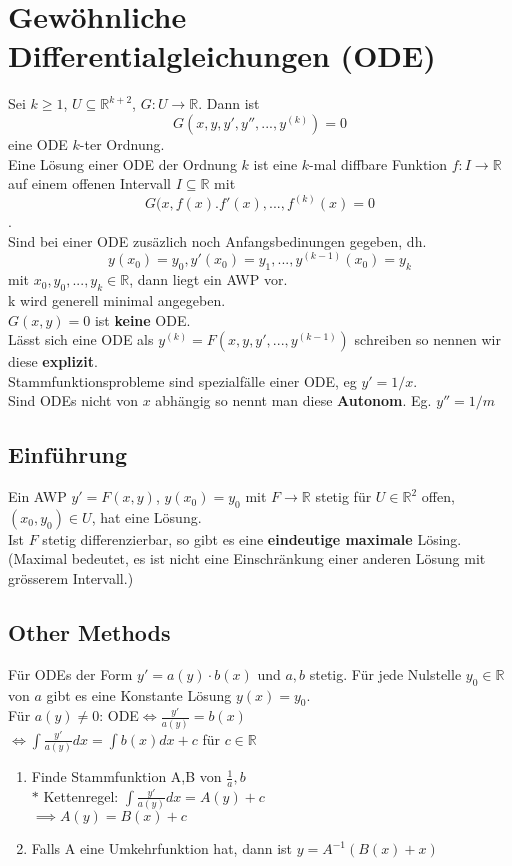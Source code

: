 \section{Gewöhnliche Differentialgleichungen (ODE)}
Sei $k\geq1$, $U\subseteq\mathbb R^{k+2}$, $G:U\rightarrow\mathbb R$. Dann ist 
$$G(x,y,y',y'',...,y^{(k)})=0$$ eine ODE $k$-ter Ordnung.\\
Eine Lösung einer ODE der Ordnung $k$ ist eine $k$-mal diffbare Funktion $f:I\rightarrow\mathbb R$
auf einem offenen Intervall $I\subseteq\mathbb R$ mit $$G(x, f(x). f'(x),...,
f^{(k)}(x)=0$$.\\
Sind bei einer ODE zusäzlich noch Anfangsbedinungen gegeben, dh.
$$y(x_0)=y_0,y'(x_0)=y_1,...,y^{(k-1)}(x_0)=y_k$$ mit $x_0,
y_0,...,y_k\in\mathbb R$, dann liegt ein AWP vor.\\
 k wird generell minimal angegeben. \\
$G(x, y)=0$ ist \textbf{keine} ODE.\\
Lässt sich eine ODE als $y^{(k)}=F(x,y,y',...,y^{(k-1)})$ schreiben so nennen
wir diese \textbf{explizit}.\\
Stammfunktionsprobleme sind spezialfälle einer ODE, eg $y'=1/x$.\\
Sind ODEs nicht von $x$ abhängig so nennt man diese \textbf{Autonom}. Eg.
$y''=1/m$\\
\subsection{Einführung}
Ein AWP $y'=F(x,y)$, $y(x_0)=y_0$ mit $F\rightarrow\mathbb R$ stetig für
$U\in\mathbb R^2$ offen, $(x_0,y_0)\in U$, hat eine Lösung.\\
Ist $F$ stetig differenzierbar, so gibt es eine \textbf{eindeutige maximale}
Lösing. (Maximal bedeutet, es ist nicht eine Einschränkung einer anderen Lösung
mit grösserem Intervall.)
\subsection{Other Methods}
Für ODEs der Form $y'=a(y)\cdot b(x)$ und $a,b$ stetig.
Für jede Nulstelle $y_0\in\mathbb R$ von $a$ gibt es eine Konstante Lösung
$y(x)=y_0$.\\
Für $a(y)\neq0$: ODE$\iff \frac{y'}{a(y)}=b(x)$\\
$\iff\int \frac{y'}{a(y)}dx=\int b(x)dx+c$ für $c\in\mathbb R$
\begin{enumerate}
  \item Finde Stammfunktion A,B von $\frac{1}{a}, b$\\
  $*$ Kettenregel: $\int\frac{y'}{a(y)}dx = A(y)+c$\\
  $\implies A(y)=B(x) + c$
  \item Falls A eine Umkehrfunktion hat, dann ist $y=A^{-1}(B(x)+x)$
\end{enumerate}


